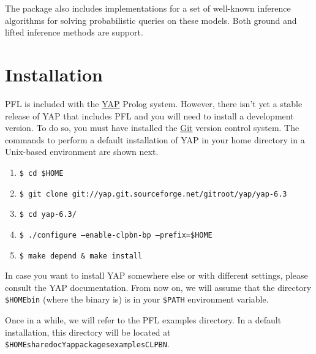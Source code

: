 \documentclass{article}
\begin{document}
The package also includes implementations for a set of well-known inference algorithms for solving probabilistic queries on these models. Both ground and lifted inference methods are support.



\section{Installation}
PFL is included with the \href{http://www.dcc.fc.up.pt/~vsc/Yap/}{YAP} Prolog system. However, there isn't yet a stable release of YAP that includes PFL and you will need to install a development version. To do so, you must have installed the \href{http://git-scm.com/}{Git} version control system. The commands to perform a default installation of YAP in your home directory in a Unix-based environment are shown next.

\begin{enumerate}
 \setlength\itemindent{-0.01cm}
 \item \texttt{\$ cd \$HOME}
 \item \texttt{\$ git clone git://yap.git.sourceforge.net/gitroot/yap/yap-6.3}
 \item \texttt{\$ cd yap-6.3/}
 \item \texttt{\$ ./configure --enable-clpbn-bp --prefix=\$HOME}
 \item \texttt{\$ make depend \& make install}
\end{enumerate}

In case you want to install YAP somewhere else or with different settings, please consult the YAP documentation. From now on, we will assume that the directory \texttt{\$HOME\pathsep bin} (where the binary is) is in your \texttt{\$PATH} environment variable.

\label{examples-directory}
Once in a while, we will refer to the PFL examples directory. In a default installation, this directory will be located at \texttt{\$HOME\pathsep share\pathsep doc\pathsep Yap\pathsep packages\pathsep examples\pathsep CLPBN}.



\end{document}
